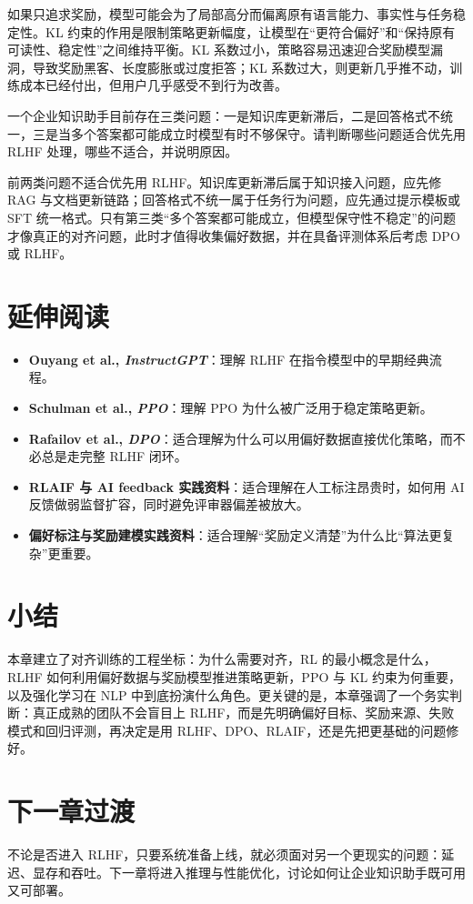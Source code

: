 \begin{solution}
如果只追求奖励，模型可能会为了局部高分而{\heiti 偏离原有语言能力、事实性与任务稳定性}。KL 约束的作用是限制策略更新幅度，让模型在“更符合偏好”和“保持原有可读性、稳定性”之间维持平衡。KL 系数过小，策略容易迅速迎合奖励模型漏洞，导致奖励黑客、长度膨胀或过度拒答；KL 系数过大，则更新几乎推不动，训练成本已经付出，但用户几乎感受不到行为改善。
\end{solution}

\begin{exercise}
一个企业知识助手目前存在三类问题：一是知识库更新滞后，二是回答格式不统一，三是当多个答案都可能成立时模型有时不够保守。请判断哪些问题适合优先用 RLHF 处理，哪些不适合，并说明原因。
\end{exercise}

\begin{solution}
前两类问题不适合优先用 RLHF。知识库更新滞后属于知识接入问题，应先修 RAG 与文档更新链路；回答格式不统一属于任务行为问题，应先通过提示模板或 SFT 统一格式。只有第三类“多个答案都可能成立，但模型保守性不稳定”的问题才像真正的对齐问题，此时才值得收集偏好数据，并在具备评测体系后考虑 DPO 或 RLHF。
\end{solution}

\section{延伸阅读}
\begin{itemize}
  \item \textbf{Ouyang et al., \emph{InstructGPT}}：理解 RLHF 在指令模型中的早期经典流程。
  \item \textbf{Schulman et al., \emph{PPO}}：理解 PPO 为什么被广泛用于稳定策略更新。
  \item \textbf{Rafailov et al., \emph{DPO}}：适合理解为什么可以用偏好数据直接优化策略，而不必总是走完整 RLHF 闭环。
  \item \textbf{RLAIF 与 AI feedback 实践资料}：适合理解在人工标注昂贵时，如何用 AI 反馈做弱监督扩容，同时避免评审器偏差被放大。
  \item \textbf{偏好标注与奖励建模实践资料}：适合理解“奖励定义清楚”为什么比“算法更复杂”更重要。
\end{itemize}

\section{小结}
本章建立了对齐训练的工程坐标：为什么需要对齐，RL 的最小概念是什么，RLHF 如何利用偏好数据与奖励模型推进策略更新，PPO 与 KL 约束为何重要，以及强化学习在 NLP 中到底扮演什么角色。更关键的是，本章强调了一个务实判断：真正成熟的团队不会盲目上 RLHF，而是先明确偏好目标、奖励来源、失败模式和回归评测，再决定是用 RLHF、DPO、RLAIF，还是先把更基础的问题修好。

\section{下一章过渡}
不论是否进入 RLHF，只要系统准备上线，就必须面对另一个更现实的问题：延迟、显存和吞吐。下一章将进入推理与性能优化，讨论如何让企业知识助手既可用又可部署。
